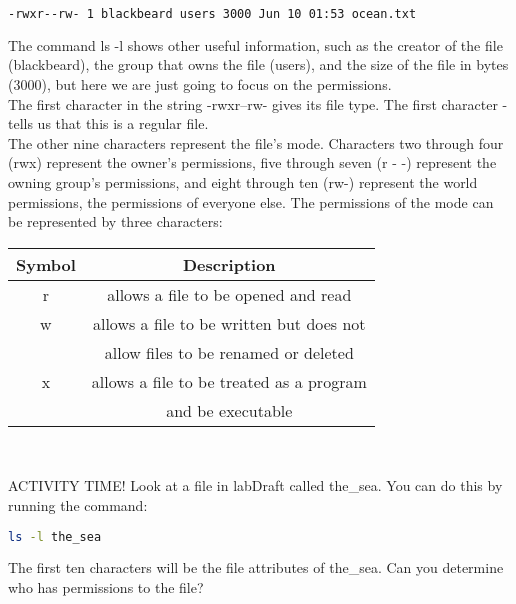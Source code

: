 \documentclass[11pt,a4paper]{article}
\begin{document}
\begin{lstlisting}[basicstyle=\ttfamily, backgroundcolor = \color{lightgray}, language = bash, xleftmargin = 0cm, framexleftmargin = 1em, breaklines=true]
-rwxr--rw- 1 blackbeard users 3000 Jun 10 01:53 ocean.txt
\end{lstlisting}

The command ls -l shows other useful information, such as the creator of the file (blackbeard), the group that owns the file (users), and the size of the file in bytes (3000), but here we are just going to focus on the permissions.\\

The first character in the string -rwxr--rw- gives its file type. The first character - tells us that this is a regular file.\\

The other nine characters represent the file's mode. Characters two through four (rwx) represent the owner's permissions, five through seven (r - -) represent the owning group's permissions, and eight through ten (rw-) represent the world permissions, the permissions of everyone else. The permissions of the mode can be represented by three characters:\\

\begin{center}
\begin{tabular}{|c|c|}
\hline
Symbol & Description \\
\hline
\hline
r  & allows a file to be opened and read\\
\hline
w & allows a file to be written but does not \\
    & allow files to be renamed or deleted\\
    \hline
x  & allows a file to be treated as a program\\
   &  and be executable\\
 \hline
\end{tabular}\\
\end{center}

ACTIVITY TIME! Look at a file in labDraft called the\_sea. You can do this by running the command:


\begin{lstlisting}[basicstyle=\ttfamily, backgroundcolor = \color{lightgray}, language = bash, xleftmargin = 0cm, framexleftmargin = 1em, breaklines=true]
ls -l the_sea
\end{lstlisting}

The first ten characters will be the file attributes of the\_sea. Can you determine who has permissions to the file?\\
\end{document}
